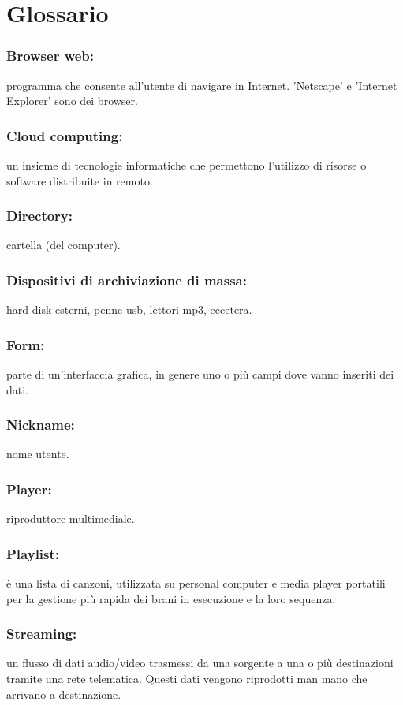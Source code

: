 \chapter{Glossario}
\thispagestyle{fancy}

\subsection*{Browser web:} programma che consente all'utente di navigare in
Internet. 'Netscape' e 'Internet Explorer' sono dei browser. 
\subsection*{Cloud computing:} un insieme di tecnologie informatiche che
permettono l'utilizzo di risorse o software distribuite in remoto.
\subsection*{Directory:} cartella (del computer).
\subsection*{Dispositivi di archiviazione di massa:} hard disk esterni, penne
usb, lettori mp3, eccetera.
\subsection*{Form:} parte di un'interfaccia grafica, in genere uno o pi\`u campi
dove vanno inseriti dei dati. 
\subsection*{Nickname:} nome utente.
\subsection*{Player:} riproduttore multimediale.
\subsection*{Playlist:} \`e una lista di canzoni, utilizzata su
personal computer e media player portatili per la gestione pi\`u rapida dei
brani in esecuzione e la loro sequenza.
\subsection*{Streaming:} un flusso di dati audio/video trasmessi da una sorgente
a una o pi\`u destinazioni tramite una rete telematica. Questi dati vengono
riprodotti man mano che arrivano a destinazione.


